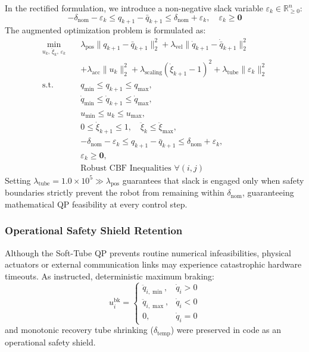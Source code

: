 \documentclass[10pt,twocolumn,a4paper]{article}
\begin{document}
In the rectified formulation, we introduce a non-negative slack variable $\varepsilon_k \in \mathbb{R}_{\ge 0}^n$:
\begin{equation}
-\delta_{\text{nom}} - \varepsilon_k \le q_{k+1} - \bar{q}_{k+1} \le \delta_{\text{nom}} + \varepsilon_k, \quad \varepsilon_k \ge \mathbf{0}
\end{equation}
The augmented optimization problem is formulated as:
\begin{align}
\min_{u_k, \, \ddot{\xi}_k, \, \varepsilon_k} \quad & \lambda_{\text{pos}} \|q_{k+1} - \bar{q}_{k+1}\|_2^2 + \lambda_{\text{vel}} \|\dot{q}_{k+1} - \dot{\bar{q}}_{k+1}\|_2^2 \nonumber\\
& + \lambda_{\text{acc}} \|u_k\|_2^2 + \lambda_{\text{scaling}} (\dot{\xi}_{k+1} - 1)^2 + \lambda_{\text{tube}} \|\varepsilon_k\|_2^2 \\
\text{s.t.} \quad & q_{\min} \le q_{k+1} \le q_{\max}, \nonumber\\
& \dot{q}_{\min} \le \dot{q}_{k+1} \le \dot{q}_{\max}, \nonumber\\
& u_{\min} \le u_k \le u_{\max}, \nonumber\\
& 0 \le \dot{\xi}_{k+1} \le 1, \quad \ddot{\xi}_k \le \ddot{\xi}_{\max}, \nonumber\\
& -\delta_{\text{nom}} - \varepsilon_k \le q_{k+1} - \bar{q}_{k+1} \le \delta_{\text{nom}} + \varepsilon_k, \nonumber\\
& \varepsilon_k \ge \mathbf{0}, \nonumber\\
& \text{Robust CBF Inequalities } \forall (i, j) \nonumber
\end{align}
Setting $\lambda_{\text{tube}} = 1.0 \times 10^5 \gg \lambda_{\text{pos}}$ guarantees that slack is engaged only when safety boundaries strictly prevent the robot from remaining within $\delta_{\text{nom}}$, guaranteeing mathematical QP feasibility at every control step.

\subsubsection{Operational Safety Shield Retention}
Although the Soft-Tube QP prevents routine numerical infeasibilities, physical actuators or external communication links may experience catastrophic hardware timeouts. As instructed, deterministic maximum braking:
\begin{equation}
u_i^{\text{bk}} = \begin{cases} \ddot{q}_{i,\min}, & \dot{q}_i > 0 \\ \ddot{q}_{i,\max}, & \dot{q}_i < 0 \\ 0, & \dot{q}_i = 0 \end{cases}
\end{equation}
and monotonic recovery tube shrinking ($\delta_{\text{temp}}$) were preserved in code as an operational safety shield.
\end{document}
